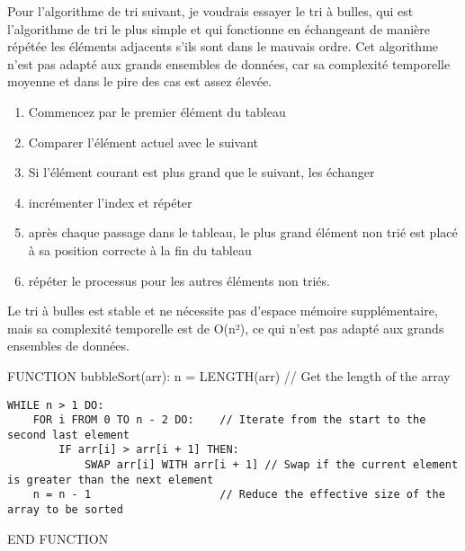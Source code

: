 \documentclass[11pt]{article}
\providecommand{\tightlist}{%
      \setlength{\itemsep}{0pt}\setlength{\parskip}{0pt}}
\begin{document}
    Pour l'algorithme de tri suivant, je voudrais essayer le tri à bulles,
qui est l'algorithme de tri le plus simple et qui fonctionne en
échangeant de manière répétée les éléments adjacents s'ils sont dans le
mauvais ordre. Cet algorithme n'est pas adapté aux grands ensembles de
données, car sa complexité temporelle moyenne et dans le pire des cas
est assez élevée.

\begin{enumerate}
\def\labelenumi{\arabic{enumi}.}
\tightlist
\item
  Commencez par le premier élément du tableau
\item
  Comparer l'élément actuel avec le suivant
\item
  Si l'élément courant est plus grand que le suivant, les échanger
\item
  incrémenter l'index et répéter
\item
  après chaque passage dans le tableau, le plus grand élément non trié
  est placé à sa position correcte à la fin du tableau
\item
  répéter le processus pour les autres éléments non triés.
\end{enumerate}

Le tri à bulles est stable et ne nécessite pas d'espace mémoire
supplémentaire, mais sa complexité temporelle est de O(n²), ce qui n'est
pas adapté aux grands ensembles de données.

    FUNCTION bubbleSort(arr): n = LENGTH(arr) // Get the length of the array

\begin{verbatim}
WHILE n > 1 DO:
    FOR i FROM 0 TO n - 2 DO:    // Iterate from the start to the second last element
        IF arr[i] > arr[i + 1] THEN:
            SWAP arr[i] WITH arr[i + 1] // Swap if the current element is greater than the next element
    n = n - 1                    // Reduce the effective size of the array to be sorted
\end{verbatim}

END FUNCTION
\end{document}
